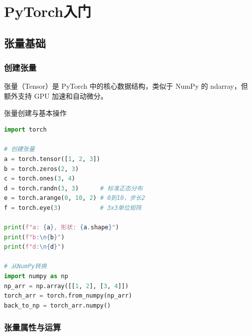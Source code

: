\chapter{PyTorch入门}


\section{张量基础}

\subsection{创建张量}

张量（Tensor）是 PyTorch 中的核心数据结构，类似于 NumPy 的 ndarray，但额外支持 GPU 加速和自动微分。

\begin{mycode}{张量创建与基本操作}
\begin{lstlisting}[language=Python]
import torch

# 创建张量
a = torch.tensor([1, 2, 3])
b = torch.zeros(2, 3)
c = torch.ones(3, 4)
d = torch.randn(3, 3)      # 标准正态分布
e = torch.arange(0, 10, 2) # 0到10，步长2
f = torch.eye(3)           # 3x3单位矩阵

print(f"a: {a}, 形状: {a.shape}")
print(f"b:\n{b}")
print(f"d:\n{d}")

# 从NumPy转换
import numpy as np
np_arr = np.array([[1, 2], [3, 4]])
torch_arr = torch.from_numpy(np_arr)
back_to_np = torch_arr.numpy()
\end{lstlisting}
\end{mycode}

\subsection{张量属性与运算}

